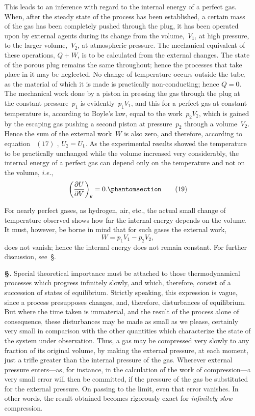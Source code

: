 \documentclass[12pt]{book}[2005/09/16]
\newcommand{\Chg}[2]{#2}
\newcommand{\Add}[1]{\Chg{}{#1}}
\newcommand{\Section}[1]{
  \medskip\par\textbf{§\;#1}
  \label{section:#1}
}
\newcommand{\SecRef}[2][§\;]{\hyperref[section:#2.]{{\upshape #1#2}}}
\newcommand{\Tag}[1]{%
  \phantomsection\label{eqn:#1}\tag*{\ensuremath{#1}}%
}
\newcommand{\Eq}[1]{%
  \hyperref[eqn:#1]{\ensuremath{#1}}%
}
\newcommand{\PageSep}[1]{\ignorespaces}
\newcommand{\ie}{\emph{i.e.}}
\newcommand{\dd}{\partial}
\begin{document}
This leads to an inference with regard to the internal
energy of a perfect gas. When, after the steady state of
the process has been established, a certain mass of the gas
has been completely pushed through the plug, it has been
\PageSep{49}
operated upon by external agents during its change from
the volume,~$V_{1}$, at high pressure, to the larger volume,~$V_{2}$,
at atmospheric pressure. The mechanical equivalent of
these operations, $Q + W$, is to be calculated from the
external changes. The state of the porous plug remains
the same throughout; hence the processes that take place
in it may be neglected. No change of temperature occurs
outside the tube, as the material of which it is made is
practically non-conducting; hence $Q = 0$. The mechanical
work done by a piston in pressing the gas through the plug
at the constant pressure~$p_{1}$ is evidently~$p_{1}V_{1}$, and this for a
perfect gas at constant temperature is, according to Boyle's
law, equal to the work~$p_{2}V_{2}$, which is gained by the
escaping gas pushing a second piston at pressure~$p_{2}$ through
a volume~$V_{2}$. Hence the sum of the external work~$W$ is
also zero, and therefore, according to equation~\Eq{(17)}, $U_{2} = U_{1}$.
As the experimental results showed the temperature to be
practically unchanged while the volume increased very considerably,
the internal energy of a perfect gas can depend
only on the temperature and not on the volume, \ie,
\[
\left(\frac{\dd U}{\dd V}\right)_{\theta} = 0\Add{.}
\Tag{(19)}
\]

For nearly perfect gases, as hydrogen, air, etc., the
actual small change of temperature observed shows how far
the internal energy depends on the volume. It must,
however, be borne in mind that for such gases the external
work,
\[
W = p_{1}V_{1} - p_{2}V_{2},
\]
does not vanish; hence the internal energy does not remain
constant. For further discussion, see~\SecRef{158}.

\Section{71.} Special theoretical importance must be attached to
%
those thermodynamical processes which progress infinitely
slowly, and which, therefore, consist of a succession of
states of equilibrium. Strictly speaking, this expression is
vague, since a process presupposes changes, and, therefore,
disturbances of equilibrium. But where the time taken is
\PageSep{50}
immaterial, and the result of the process alone of consequence,
these disturbances may be made as small as we
please, certainly very small in comparison with the other
quantities which characterize the state of the system under
observation. Thus, a gas may be compressed very slowly to
any fraction of its original volume, by making the external
pressure, at each moment, just a trifle greater than the
internal pressure of the gas. Wherever external pressure
enters---as, for instance, in the calculation of the work of
compression---a very small error will then be committed, if
the pressure of the gas be substituted for the external
pressure. On passing to the limit, even that error vanishes.
In other words, the result obtained becomes rigorously
exact for \emph{infinitely slow} compression.
%
\end{document}
